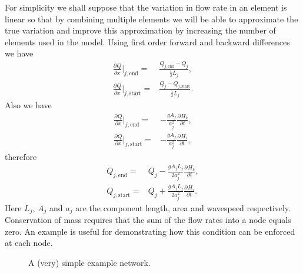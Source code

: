 \documentclass[12pt]{article}
\newcommand{\pardiv}[3]{\frac{\partial^{#1} #2}{\partial #3^{#1}}}
\begin{document}
For simplicity we shall suppose that the variation in flow rate in an element is linear so that by combining multiple elements we will be able to approximate the true variation and improve this approximation by increasing the number of elements used in the model. Using first order forward and backward differences we have 
\begin{align}
\pardiv{}{Q}{x} \bigg\vert_{j,\text{end}} =& \frac{Q_{j,\text{end}} - Q_j}{\frac{1}{2}L_j}, \\
\pardiv{}{Q}{x} \bigg\vert_{j,\text{start}} =& \frac{Q_j - Q_{j,\text{start}}}{\frac{1}{2}L_j}. 
\end{align} 
Also we have 
\begin{align}
\pardiv{}{Q}{x} \bigg\vert_{j,\text{end}} =& -\frac{gA_j}{a_j^2} \pardiv{}{H_k}{t}, \\
\pardiv{}{Q}{x} \bigg\vert_{j,\text{start}} =& -\frac{gA_j}{a_j^2} \pardiv{}{H_i}{t}, 
\end{align}
therefore
\begin{align}
Q_{j,\text{end}} =& Q_j - \frac{gA_j L_j}{2 a_j^2} \pardiv{}{H_k}{t}, \\
Q_{j,\text{start}} =& Q_j + \frac{gA_j L_j}{2 a_j^2} \pardiv{}{H_i}{t}.
\end{align}
Here $L_j$, $A_j$ and $a_j$ are the component length, area and wavespeed respectively. Conservation of mass requires that the sum of the flow rates into a node equals zero. An example is useful for demonstrating how this condition can be enforced at each node. 

\begin{figure}
\centering
{} 
\caption{A (very) simple example network.}
\label{fig:discrete_calculus_example_network}
\end{figure}
\end{document}
